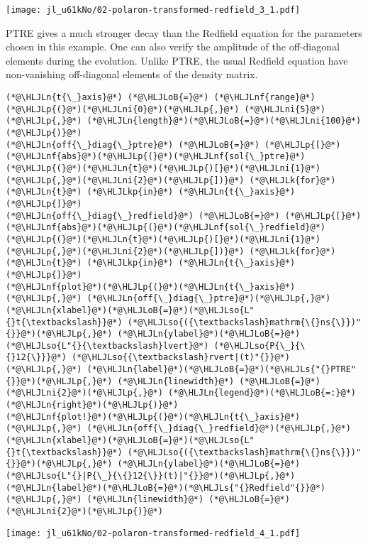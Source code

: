 \documentclass[12pt,a4paper]{article}
\newcommand{\HLJLk}[1]{\textcolor[RGB]{148,91,176}{\textbf{#1}}}
\newcommand{\HLJLkp}[1]{\textcolor[RGB]{148,91,176}{\textbf{#1}}}
\newcommand{\HLJLn}[1]{#1}
\newcommand{\HLJLnf}[1]{\textcolor[RGB]{66,102,213}{#1}}
\newcommand{\HLJLs}[1]{\textcolor[RGB]{201,61,57}{#1}}
\newcommand{\HLJLso}[1]{\textcolor[RGB]{201,61,57}{#1}}
\newcommand{\HLJLni}[1]{\textcolor[RGB]{59,151,46}{#1}}
\newcommand{\HLJLoB}[1]{\textcolor[RGB]{102,102,102}{\textbf{#1}}}
\newcommand{\HLJLp}[1]{#1}
\begin{document}
\texttt{[image: jl\_u61kNo/02-polaron-transformed-redfield\_3\_1.pdf]}

PTRE gives a much stronger decay than the Redfield equation for the parameters chosen in this example. One can also verify the amplitude of the off-diagonal elements during the evolution. Unlike PTRE, the usual Redfield equation have non-vanishing off-diagonal elements of the density matrix.


\begin{lstlisting}
(*@\HLJLn{t{\_}axis}@*) (*@\HLJLoB{=}@*) (*@\HLJLnf{range}@*)(*@\HLJLp{(}@*)(*@\HLJLni{0}@*)(*@\HLJLp{,}@*) (*@\HLJLni{5}@*)(*@\HLJLp{,}@*) (*@\HLJLn{length}@*)(*@\HLJLoB{=}@*)(*@\HLJLni{100}@*)(*@\HLJLp{)}@*)
(*@\HLJLn{off{\_}diag{\_}ptre}@*) (*@\HLJLoB{=}@*) (*@\HLJLp{[}@*)(*@\HLJLnf{abs}@*)(*@\HLJLp{(}@*)(*@\HLJLnf{sol{\_}ptre}@*)(*@\HLJLp{(}@*)(*@\HLJLn{t}@*)(*@\HLJLp{)[}@*)(*@\HLJLni{1}@*)(*@\HLJLp{,}@*)(*@\HLJLni{2}@*)(*@\HLJLp{])}@*) (*@\HLJLk{for}@*) (*@\HLJLn{t}@*) (*@\HLJLkp{in}@*) (*@\HLJLn{t{\_}axis}@*)(*@\HLJLp{]}@*)
(*@\HLJLn{off{\_}diag{\_}redfield}@*) (*@\HLJLoB{=}@*) (*@\HLJLp{[}@*)(*@\HLJLnf{abs}@*)(*@\HLJLp{(}@*)(*@\HLJLnf{sol{\_}redfield}@*)(*@\HLJLp{(}@*)(*@\HLJLn{t}@*)(*@\HLJLp{)[}@*)(*@\HLJLni{1}@*)(*@\HLJLp{,}@*)(*@\HLJLni{2}@*)(*@\HLJLp{])}@*) (*@\HLJLk{for}@*) (*@\HLJLn{t}@*) (*@\HLJLkp{in}@*) (*@\HLJLn{t{\_}axis}@*)(*@\HLJLp{]}@*)
(*@\HLJLnf{plot}@*)(*@\HLJLp{(}@*)(*@\HLJLn{t{\_}axis}@*)(*@\HLJLp{,}@*) (*@\HLJLn{off{\_}diag{\_}ptre}@*)(*@\HLJLp{,}@*) (*@\HLJLn{xlabel}@*)(*@\HLJLoB{=}@*)(*@\HLJLso{L"{}t{\textbackslash}}@*) (*@\HLJLso{({\textbackslash}mathrm{\{}ns{\}})"{}}@*)(*@\HLJLp{,}@*) (*@\HLJLn{ylabel}@*)(*@\HLJLoB{=}@*)(*@\HLJLso{L"{}{\textbackslash}lvert}@*) (*@\HLJLso{P{\_}{\{}12{\}}}@*) (*@\HLJLso{{\textbackslash}rvert|(t)"{}}@*)(*@\HLJLp{,}@*) (*@\HLJLn{label}@*)(*@\HLJLoB{=}@*)(*@\HLJLs{"{}PTRE"{}}@*)(*@\HLJLp{,}@*) (*@\HLJLn{linewidth}@*) (*@\HLJLoB{=}@*) (*@\HLJLni{2}@*)(*@\HLJLp{,}@*) (*@\HLJLn{legend}@*)(*@\HLJLoB{=:}@*)(*@\HLJLn{right}@*)(*@\HLJLp{)}@*)
(*@\HLJLnf{plot!}@*)(*@\HLJLp{(}@*)(*@\HLJLn{t{\_}axis}@*)(*@\HLJLp{,}@*) (*@\HLJLn{off{\_}diag{\_}redfield}@*)(*@\HLJLp{,}@*) (*@\HLJLn{xlabel}@*)(*@\HLJLoB{=}@*)(*@\HLJLso{L"{}t{\textbackslash}}@*) (*@\HLJLso{({\textbackslash}mathrm{\{}ns{\}})"{}}@*)(*@\HLJLp{,}@*) (*@\HLJLn{ylabel}@*)(*@\HLJLoB{=}@*)(*@\HLJLso{L"{}|P{\_}{\{}12{\}}(t)|"{}}@*)(*@\HLJLp{,}@*) (*@\HLJLn{label}@*)(*@\HLJLoB{=}@*)(*@\HLJLs{"{}Redfield"{}}@*)(*@\HLJLp{,}@*) (*@\HLJLn{linewidth}@*) (*@\HLJLoB{=}@*) (*@\HLJLni{2}@*)(*@\HLJLp{)}@*)
\end{lstlisting}

\texttt{[image: jl\_u61kNo/02-polaron-transformed-redfield\_4\_1.pdf]}
\end{document}
